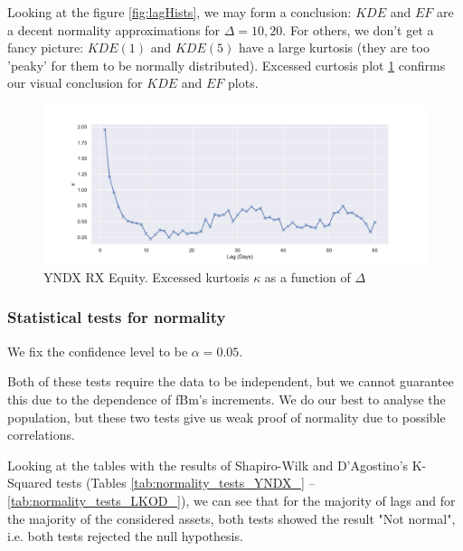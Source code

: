             Looking at the figure \ref{fig:lagHists}, we may form a conclusion: $KDE$ and $EF$ are a decent normality approximations 
            for $\Delta = 10, 20$. For others, we don't get a fancy picture: $KDE(1)$ and $KDE(5)$ have a large kurtosis 
            (they are too 'peaky' for them to be normally distributed). 
            Excessed curtosis plot \ref{fig:exkurt} confirms our visual conclusion for $KDE$ and $EF$ plots.

            \begin{figure}[htbp]
                \includegraphics[width=\textwidth]{fig/YNDX RX Equity Excessed Curtosis.pdf}
                \caption{YNDX RX Equity. Excessed kurtosis $\kappa$ as a function of $\Delta$}
                \label{fig:exkurt}
            \end{figure}


        \subsubsection{Statistical tests for normality}
            We fix the confidence level to be $\alpha = 0.05$.
            \begin{nb}
                Both of these tests require the data to be independent, but we cannot guarantee this 
                due to the dependence of fBm's increments. We do our best to analyse the population,
                but these two tests give us weak proof of normality due to possible correlations.
            \end{nb}
            Looking at the tables with the results of Shapiro-Wilk and D'Agostino's K-Squared tests 
            (Tables \ref{tab:normality_tests_YNDX_} -- \ref{tab:normality_tests_LKOD_}), we can see that for the majority of lags and for the 
            majority of the considered assets, both tests showed the result "Not normal", i.e. both tests
            rejected the null hypothesis. 

            \medskip
            

